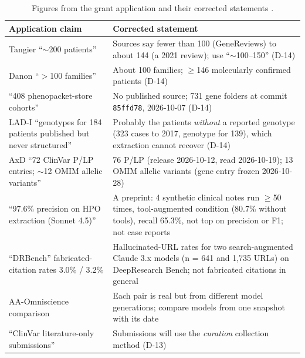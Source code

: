 \documentclass{article} %
\begin{document}
\begin{table}[h]
\caption{Figures from the grant application and their corrected statements \citep{koseki2021_tangier_review,genereviews_tangier,sugie2024_danon_history,larsen2026_hpo_mcp,rao2026_reference_hallucination,jackson2025_aa_omniscience}.}
\begin{center}
\scriptsize
\begin{tabular}{p{4.3cm}p{8.6cm}}
\toprule
Application claim & Corrected statement \\
\midrule
Tangier ``$\sim$200 patients'' & Sources say fewer than 100 (GeneReviews) to about 144 (a 2021 review); use ``$\sim$100--150'' (D-14) \\
Danon ``$>$100 families'' & About 100 families; $\geq$146 molecularly confirmed patients (D-14) \\
``408 phenopacket-store cohorts'' & No published source; 731 gene folders at commit \texttt{85ffd78}, 2026-10-07 (D-14) \\
LAD-I ``genotypes for 184 patients published but never structured'' & Probably the patients \emph{without} a reported genotype (323 cases to 2017, genotype for 139), which extraction cannot recover (D-14) \\
AxD ``72 ClinVar P/LP entries; $\sim$12 OMIM allelic variants'' & 76 P/LP (release 2026-10-12, read 2026-10-19); 13 OMIM allelic variants (gene entry frozen 2026-10-28) \\
``97.6\% precision on HPO extraction (Sonnet 4.5)'' & A preprint: 4 synthetic clinical notes run $\geq$50 times, tool-augmented condition (80.7\% without tools), recall 65.3\%, not top on precision or F1; not case reports \\
``DRBench'' fabricated-citation rates 3.0\% / 3.2\% & Hallucinated-URL rates for two search-augmented Claude 3.x models (n = 641 and 1,735 URLs) on DeepResearch Bench; not fabricated citations in general \\
AA-Omniscience comparison & Each pair is real but from different model generations; compare models from one snapshot with its date \\
``ClinVar literature-only submissions'' & Submissions will use the \emph{curation} collection method (D-13) \\
\bottomrule
\end{tabular}
\end{center}
\end{table}
\end{document}
